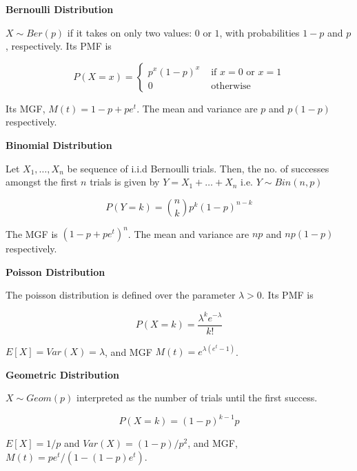 \documentclass[a4paper]{article}
\newcommand{\subheading}[1]{{\scriptsize\textbf{#1}}}
\begin{document}
\scriptsize                         %
\setlength\parindent{0pt}           %
\setlength{\abovedisplayskip}{3pt}  %
\setlength{\belowdisplayskip}{3pt}  %


\begin{multicols*}{4}

\subheading{Bernoulli Distribution}

$X \sim Ber(p)$ if it takes on only two values: $0$ or $1$, with probabilities $1-p$ and $p$, respectively. Its PMF
is

$$P(X = x) = \begin{cases}
  p^x(1-p)^x & \text{ if $x = 0$ or $x = 1$} \\
  0   & \text{ otherwise}
\end{cases}$$

Its MGF, $M(t) = 1-p + pe^t$. The mean and variance are $p$ and $p(1-p)$ respectively.\smallskip

\subheading{Binomial Distribution}

Let $X_1, \dots ,X_n$ be sequence of i.i.d Bernoulli trials. Then, the no. of successes amongst the first $n$ trials is given by $Y = X_1 + \dots + X_n$ i.e.  $Y \sim Bin(n,p)$

$$P(Y=k) = \binom{n}{k}p^k(1-p)^{n-k}$$

The MGF is $(1-p+pe^t)^n$. The mean and variance are $np$ and $np(1-p)$
respectively.
\smallskip

\subheading{Poisson Distribution}

The poisson distribution is defined over the parameter $\lambda >0$. Its PMF is

$$P(X=k) = \frac{\lambda^k e^{-\lambda}}{k!}$$

$E[X] = Var(X) = \lambda$, and MGF $M(t) = e^{\lambda(e^t-1)}$. \smallskip

\subheading{Geometric Distribution}

$X \sim Geom(p)$ interpreted as the number of trials until the first success.

$$P(X=k) = (1-p)^{k-1}p$$

$E[X] = 1/p$ and $Var(X) = (1-p)/p^2$, and MGF, $M(t) = pe^t/(1 - (1-p)e^t)$. \smallskip


\end{multicols*}
\end{document}
